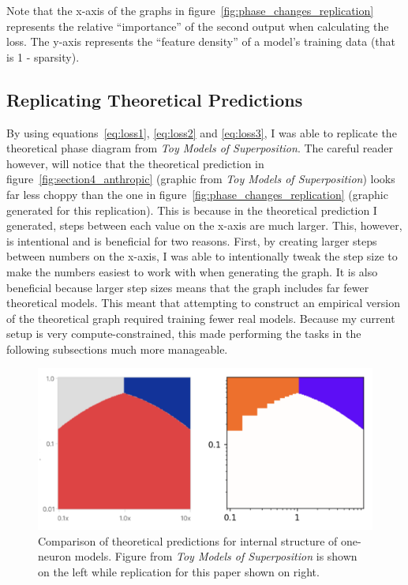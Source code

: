 \documentclass{article} %
\begin{document}
Note that the x-axis of the graphs in figure~\ref{fig:phase_changes_replication}
represents the relative ``importance'' of the second output when calculating the
loss. The y-axis represents the ``feature density'' of a model's training data
(that is 1 - sparsity).

\subsection{Replicating Theoretical Predictions}
\label{sec:theoretical_preds}

By using equations~\ref{eq:loss1}, \ref{eq:loss2} and \ref{eq:loss3},
I was able to replicate the theoretical phase diagram from
\textit{Toy Models of Superposition}.
The careful reader however, will notice that the theoretical prediction in
figure~\ref{fig:section4_anthropic} (graphic from \textit{Toy Models of 
Superposition}) looks far less choppy than the one in figure~\ref{fig:phase_changes_replication} (graphic
generated for this replication). This is because in the theoretical prediction I 
generated, steps between each value on the x-axis are much larger. This, however, is
intentional and is beneficial for two reasons. First, by creating larger steps 
between numbers on
the x-axis, I was able to intentionally tweak the step size to make the numbers
easiest to work with when generating the graph. It is also beneficial because
larger step sizes means that the graph includes far fewer theoretical
models. This meant that attempting to construct an empirical version of the theoretical graph 
required training fewer real models. Because my current setup is very 
compute-constrained, this made performing the tasks in the following subsections
much more manageable.

\begin{figure}[h]
    \centering
    \includegraphics[width=0.5\linewidth]{phase_changes/images/theoretical_predictions.png}
    \captionsetup{font=footnotesize, width=0.7\linewidth} %
    \caption{
        Comparison of theoretical predictions for internal structure of one-neuron 
        models. Figure from \textit{Toy Models of Superposition} is shown on the 
        left while replication for this paper shown on right. 
    }
    \label{fig:theoretical_preditions}
\end{figure}
\end{document}
